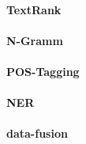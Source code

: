 \paragraph{TextRank}

\paragraph{N-Gramm}

\paragraph{POS-Tagging}

\paragraph{NER}

\paragraph{data-fusion}
